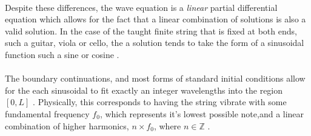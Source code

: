 \documentclass[12pt,letterpaper]{article}
\begin{document}
\paragraph*{}Despite these differences, the wave equation is a \textit{linear} partial differential equation which allows for the fact that a linear combination of solutions is also a valid solution. In the case of the taught finite string that is fixed at both ends, such a guitar, viola or cello, the a solution tends to take the form of a sinusoidal function such a sine or cosine \cite{Hunter, Taylor, White}.

\paragraph*{}The boundary continuations, and most forms of standard initial conditions allow for the each sinusoidal to fit exactly an integer wavelengths into the region $[0,L]$ \cite{Haberman,Hunter}. Physically, this corresponds to having the string vibrate with some fundamental frequency $f_0$, which represents it's lowest possible note,and a linear combination of higher harmonics, $n \times f_0$, where $n \in \mathbb{Z}$ \cite{Olson,Taylor,White}.
\end{document}
